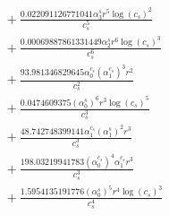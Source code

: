 \documentclass[10pt]{article}
\begin{document}
\begin{align*}
&{}  + \frac{0.022091126771041 \alpha_{3}^s r^{5} \log{\left(c_{s} \right)}^{2}}{c_{s}^{5}} \\
&{}  + \frac{0.00069887861331449 \alpha_{2}^s r^{6} \log{\left(c_{s} \right)}^{3}}{c_{s}^{6}} \\
&{}  + \frac{93.981346829645 \alpha_{0}^{c_s} \left(\alpha_{1}^{c_s}\right)^{3} r^{2}}{c_{s}^{2}} \\
&{}  + \frac{0.0474609375 \left(\alpha_{0}^s\right)^{6} r^{3} \log{\left(c_{s} \right)}^{5}}{c_{s}^{3}} \\
&{}  + \frac{48.742748399141 \alpha_{1}^{c_s} \left(\alpha_{1}^s\right)^{2} r^{3}}{c_{s}^{3}} \\
&{}  + \frac{198.03219941783 \left(\alpha_{0}^{c_s}\right)^{4} \alpha_{1}^{c_s} r^{3}}{c_{s}^{3}} \\
&{}  + \frac{1.5954135191776 \left(\alpha_{0}^s\right)^{5} r^{4} \log{\left(c_{s} \right)}^{3}}{c_{s}^{4}}
\end{align*}
\end{document}
